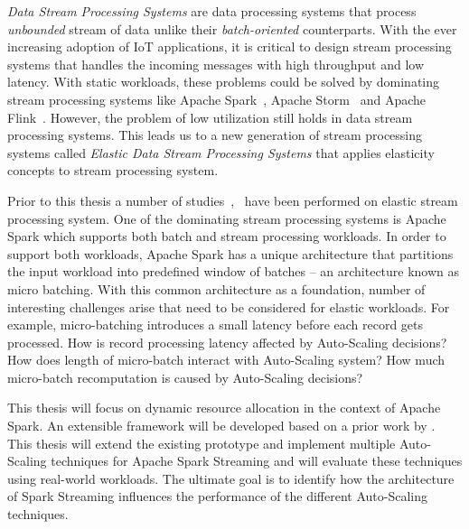 \emph{Data Stream Processing Systems} are data processing systems that process \emph{unbounded} stream of data unlike their \emph{batch-oriented} counterparts. With the ever increasing adoption of IoT applications, it is critical to design stream processing systems that handles the incoming messages with high throughput and low latency. With static workloads, these problems could be solved by dominating stream processing systems like Apache Spark~\cite{spark}, Apache Storm~\cite{Storm} and Apache Flink~\cite{flink}. However, the problem of low utilization still holds in data stream processing systems. This leads us to a new generation of stream processing systems called \emph{Elastic Data Stream Processing Systems} that applies elasticity concepts to stream processing system.

Prior to this thesis a number of studies~\cite{CastroFernandez:2013},~\cite{Heinze:2014} have been performed on elastic stream processing system. One of the dominating stream processing systems is Apache Spark which supports both batch and stream processing workloads. In order to support both workloads, Apache Spark has a unique architecture that partitions the input workload into predefined window of batches -- an architecture known as micro batching. With this common architecture as a foundation, number of interesting challenges arise that need to be considered for elastic workloads. For example, micro-batching introduces a small latency before each record gets processed. How is record processing latency affected by Auto-Scaling decisions? How does length of micro-batch interact with Auto-Scaling system? How much micro-batch recomputation is caused by Auto-Scaling decisions?

This thesis will focus on dynamic resource allocation in the context of Apache Spark. An extensible framework will be developed based on a prior work by \textcite{Michal:2017}. This thesis will extend the existing prototype and implement multiple Auto-Scaling techniques for Apache Spark Streaming and will evaluate these techniques using real-world workloads. The ultimate goal is to identify how the architecture of Spark Streaming influences the performance of the different Auto-Scaling techniques.

